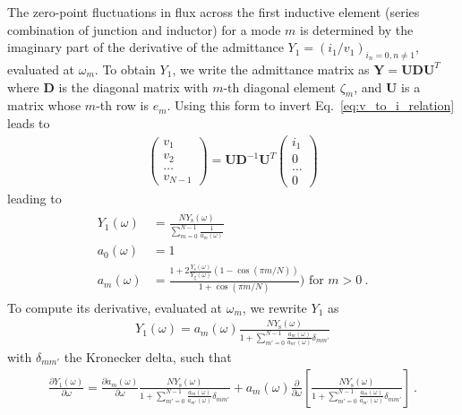 The zero-point fluctuations in flux across the first inductive element (series combination of junction and inductor) for a mode $m$ is determined by the imaginary part of the derivative of the admittance $Y_1 = \left(i_1/v_1\right)_{i_n = 0, n\ne 1}$, evaluated at $\omega_m$.
%
To obtain $Y_1$, we write the admittance matrix as $\mathbf{Y} = \mathbf{U} \mathbf{D} \mathbf{U}^{T} $ where $  \mathbf{D} $ is the diagonal matrix with  $m$-th diagonal element $\zeta_m$,  and $ \mathbf{U}$ is a matrix whose $m$-th row is $e_m$.
%
Using this form to invert Eq.~\eqref{eq:v_to_i_relation} leads to
\begin{align}
%
\left(
\begin{array}{c}
v_{1} \\
v_{2} \\
\dots \\
v_{N-1}
\end{array}
\right)
=
\mathbf{U} \mathbf{D}^{-1} \mathbf{U}^{T}
\left(
\begin{array}{c}
i_1   \\
0     \\
\dots \\
0
\end{array}
\right)
\end{align}
leading to
\begin{align}
\begin{split}
Y_{1}(\omega)&=  \frac{N Y_\text{s} (\omega)}{\sum_{m=0}^{N-1}\frac{1}{a_m(\omega)}}\\
a_0(\omega) &= 1\\
a_{m}(\omega) &= \frac{1+2\frac{Y_\text{s}(\omega)}{Y_\text{g}(\omega)}(1 - \cos (\pi m/ N))}{ 1 + \cos (\pi m/ N) })\text{ for }m>0\ .
\end{split}
\end{align}
To compute its derivative, evaluated at $\omega_m$, we rewrite $Y_1$ as
\begin{align}
Y_{1}(\omega)=  a_m(\omega)\frac{N Y_\text{s}(\omega) }{1+\sum_{m'=0}^{N-1}\frac{a_m(\omega)}{a_{m'}(\omega)}\delta_{mm'}}
\end{align}
with $\delta_{mm'}$ the Kronecker delta, such that
\begin{align}
\frac{\partial Y_{1}(\omega)}{\partial\omega}=  \frac{\partial a_m(\omega)}{\partial\omega}\frac{N Y_\text{s}(\omega) }{1+\sum_{m'=0}^{N-1}\frac{a_m(\omega)}{a_{m'}(\omega)}\delta_{mm'}}+ a_m(\omega)\frac{\partial }{\partial\omega}\left[\frac{N Y_\text{s}(\omega) }{1+\sum_{m'=0}^{N-1}\frac{a_m(\omega)}{a_{m'}(\omega)}\delta_{mm'}}\right]\ .
\end{align}
